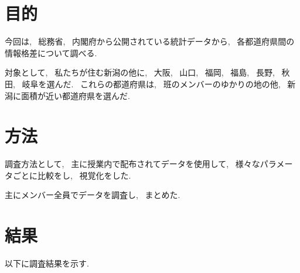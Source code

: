 \documentclass{jsarticle}
\begin{document}
\section{目的}
    今回は, ~総務省, ~内閣府から公開されている統計データから,
    ~各都道府県間の情報格差について調べる.

    対象として, ~私たちが住む新潟の他に, ~大阪, ~山口, ~福岡,
    ~福島, ~長野, ~秋田, ~岐阜を選んだ.
    ~これらの都道府県は, ~班のメンバーのゆかりの地の他,
    ~新潟に面積が近い都道府県を選んだ.

\section{方法}
    調査方法として, ~主に授業内で配布されてデータを使用して,
    ~様々なパラメータごとに比較をし, ~視覚化をした.

    主にメンバー全員でデータを調査し, ~まとめた.

\section{結果}
    以下に調査結果を示す.

    \subsection{}

\end{document}
